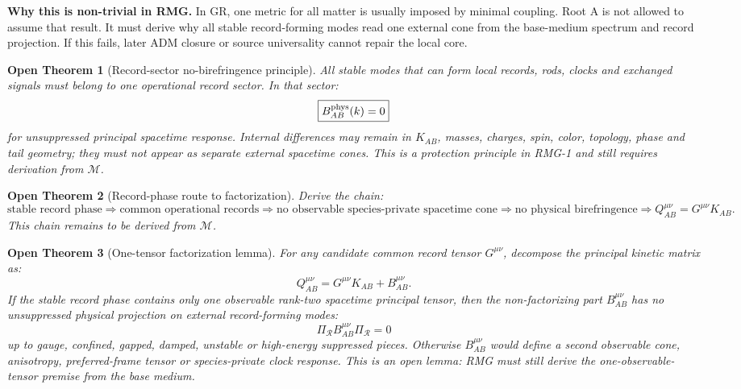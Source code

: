 \documentclass[11pt]{article}
\newtheorem{openthm}{Open Theorem}
\begin{document}
\medskip\noindent\textbf{Why this is non-trivial in RMG.}
In GR, one metric for all matter is usually imposed by minimal coupling.  Root
A is not allowed to assume that result.  It must derive why all stable
record-forming modes read one external cone from the base-medium spectrum and
record projection.  If this fails, later ADM closure or source universality
cannot repair the local core.

\begin{openthm}[Record-sector no-birefringence principle]
All stable modes that can form local records, rods, clocks and exchanged
signals must belong to one operational record sector.  In that sector:
\[
\boxed{
B_{AB}^{\rm phys}(k)=0
}
\]
for unsuppressed principal spacetime response.  Internal differences may remain
in \(K_{AB}\), masses, charges, spin, color, topology, phase and tail geometry;
they must not appear as separate external spacetime cones.  This is a
protection principle in RMG-1 and still requires derivation from
\(\mathcal M\).
\end{openthm}

\begin{openthm}[Record-phase route to factorization]
Derive the chain:
\[
\boxed{
\text{stable record phase}
\Rightarrow
\text{common operational records}
\Rightarrow
\text{no observable species-private spacetime cone}
\Rightarrow
\text{no physical birefringence}
\Rightarrow
Q_{AB}^{\mu\nu}=G^{\mu\nu}K_{AB}.
}
\]
This chain remains to be derived from \(\mathcal M\).
\end{openthm}

\begin{openthm}[One-tensor factorization lemma]
For any candidate common record tensor \(G^{\mu\nu}\), decompose the
principal kinetic matrix as:
\[
\boxed{
Q_{AB}^{\mu\nu}
=
G^{\mu\nu}K_{AB}
+
B_{AB}^{\mu\nu}.
}
\]
If the stable record phase contains only one observable rank-two spacetime
principal tensor, then the non-factorizing part \(B_{AB}^{\mu\nu}\) has no
unsuppressed physical projection on external record-forming modes:
\[
\boxed{
\Pi_{\mathcal R}B_{AB}^{\mu\nu}\Pi_{\mathcal R}=0
}
\]
up to gauge, confined, gapped, damped, unstable or high-energy suppressed
pieces.  Otherwise \(B_{AB}^{\mu\nu}\) would define a second observable cone,
anisotropy, preferred-frame tensor or species-private clock response.  This is
an open lemma: RMG must still derive the one-observable-tensor premise from the
base medium.
\end{openthm}
\end{document}
